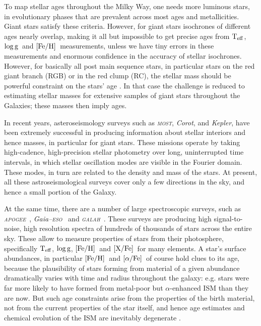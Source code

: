 \documentclass[12pt, preprint]{aastex}
\newcommand{\project}[1]{\textsl{#1}}
\newcommand{\apogee}{\project{\textsc{apogee}}}
\newcommand{\corot}{\project{Corot}}
\newcommand{\kepler}{\project{Kepler}}
\newcommand{\gaiaeso}{\project{Gaia--\textsc{eso}}}
\newcommand{\galah}{\project{\textsc{galah}}}
\newcommand{\most}{\project{\textsc{most}}}
\newcommand{\teff}{\mbox{$\rm T_{eff}$}}
\newcommand{\feh}{\mbox{$\rm [Fe/H]$}}
\newcommand{\xfe}{\mbox{$\rm [X/Fe]$}}
\newcommand{\alphafe}{\mbox{$\rm [\alpha/Fe]$}}
\newcommand{\logg}{\mbox{$\rm \log g$}}
\begin{document}
To map stellar ages throughout the Milky Way, one needs more luminous stars, in evolutionary phases that are prevalent 
across most ages and metallicities. Giant stars satisfy these criteria. However, for giant stars isochrones of different ages nearly overlap, making it 
all but impossible to get precise ages from \teff , \logg\  and \feh\ measurements, unless we have tiny errors in these measurements
and enormous confidence in the accuracy of stellar isochrones. 
However, for basically all post main sequence stars, in particular stars on the red giant branch (RGB) or in the red clump (RC), the stellar mass should be
powerful constraint on the stars' age \citep[see e.g.,][]{Martig2014}. In that case the challenge is reduced to estimating stellar masses for extensive samples
of giant stars throughout the Galaxies; these masses then imply ages.

In recent years, asteroseismology surveys such as \most, \corot, and \kepler, have
been extremely successful in producing information
about stellar interiors and hence masses, in particular for giant stars. 
These missions operate by taking high-cadence, high-precision stellar
photometry over long, uninterrupted time intervals, in which stellar oscillation 
modes are visible in the Fourier domain. These modes, in turn are related to the density and mass of the stars.
At present, all these astroseismological surveys cover only a few directions in the sky, and hence a small portion of the Galaxy.

At the same time, there are a number of large spectroscopic surveys, such
as \apogee\ \citep{Majewski2012}, \gaiaeso\ \citep{Gilmore2012} and \galah\ \citep{Freeman2012}. These surveys are 
producing high signal-to-noise, high resolution spectra
of hundreds of thousands of stars across the entire sky. These allow to measure properties of stars from their photosphere, specifically \teff, \logg, \feh\ and \xfe\ for many elements. A star's surface abundances, in particular \feh\ and \alphafe\ of course hold clues to its age, because the plausibility of stars forming from material of a given abundance dramatically varies with time and radius throughout the galaxy: e.g. stars 
were far more likely to have formed from metal-poor but $\alpha$-enhanced ISM than they are now. But such age constraints arise from the properties of the birth material, not from the current properties of the star itself, and hence age estimates and chemical evolution of the ISM are inevitably degenerate \citep[see e.g.,][]{Schonrich2009, Ch2002}.
\end{document}
